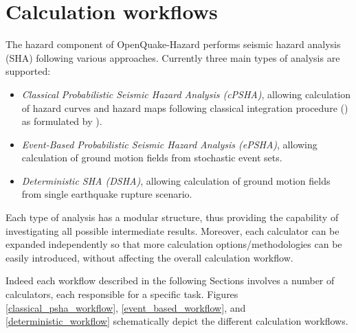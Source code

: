 %
\section{Calculation workflows}
The hazard component of OpenQuake-Hazard performs seismic hazard 
analysis (SHA) following various approaches. 
%
Currently three main types of analysis are supported:
\begin{itemize}
\item \textit{Classical Probabilistic Seismic Hazard Analysis (cPSHA)}, 
allowing calculation of hazard curves and hazard maps following 
classical integration procedure 
(\cite{cornell1968}) as formulated by \cite{field2003}).
\item \textit{Event-Based Probabilistic Seismic Hazard Analysis (ePSHA)}, 
allowing calculation of ground motion fields from stochastic event sets.
\item \textit{Deterministic SHA (DSHA)}, allowing calculation of ground motion 
fields from single earthquake rupture scenario.
\end{itemize}
Each type of analysis has a modular structure, thus providing the capability 
of investigating all possible intermediate results. Moreover, each calculator 
can be expanded independently so that more calculation options/methodologies 
can be easily introduced, without affecting the overall calculation workflow.

Indeed each workflow described in the following Sections involves a number 
of calculators, each responsible for a specific task. 
Figures \ref{classical_psha_workflow}, \ref{event_based_workflow}, and 
\ref{deterministic_workflow} schematically depict the different calculation 
workflows.
%

